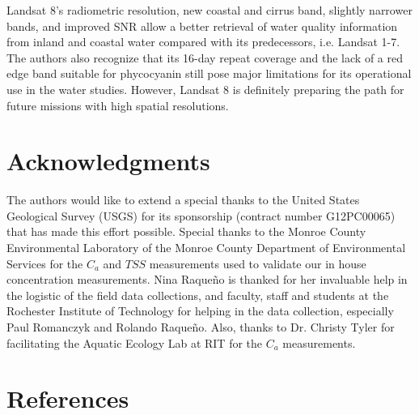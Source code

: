 \documentclass[onecolumn,3p,letterpaper]{elsarticle}
\begin{document}
Landsat 8's radiometric resolution, new coastal and cirrus band, slightly narrower bands, and improved SNR allow a better retrieval of water quality information from inland and coastal water compared with its predecessors, i.e. Landsat 1-7. The authors also recognize that its 16-day repeat coverage and the lack of a red edge band suitable for phycocyanin still pose major limitations for its operational use in the water studies. However, Landsat 8 is definitely preparing the path for future missions with high spatial resolutions.

\section*{Acknowledgments}
\vspace{-.2cm}
The authors would like to extend a special thanks to the United States Geological Survey (USGS) for its sponsorship (contract number G12PC00065) that has made this effort possible. Special thanks to the Monroe County Environmental Laboratory of the Monroe County Department of Environmental Services for the $C_a$ and $TSS$ measurements used to validate our in house concentration measurements. Nina Raque\~{n}o is thanked for her invaluable help in the logistic of the field data collections, and faculty, staff and students at the Rochester Institute of Technology for helping in the data collection, especially Paul Romanczyk and Rolando Raque\~{n}o. Also, thanks to Dr. Christy Tyler for facilitating the Aquatic Ecology Lab at RIT for the $C_a$ measurements.
\section*{References}


%

%

\end{document}
